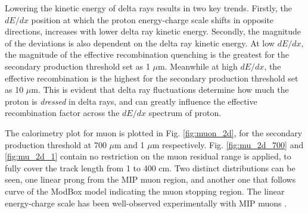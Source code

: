 Lowering the kinetic energy of delta rays results in two key trends.
Firstly, the $dE/dx$ position at which the proton energy-charge scale shifts in opposite directions, increases with lower delta ray kinetic energy. 
Secondly, the magnitude of the deviations is also dependent on the delta ray kinetic energy. 
At low $dE/dx$, the magnitude of the effective recombination quenching is the greatest for the secondary production threshold set as 1 $\mu$m. 
Meanwhile at high $dE/dx$, the effective recombination is the highest for the secondary production threshold set as 10 $\mu$m. 
This is evident that delta ray fluctuations determine how much the proton is \textit{dressed} in delta rays, and can greatly influence the effective recombination factor across the $dE/dx$ spectrum of proton. 

The calorimetry plot for muon is plotted in Fig. \ref{fig:muon_2d}, for the secondary production threshold at 700 $\mu$m and 1 $\mu$m respectively.
Fig. \ref{fig:mu_2d_700} and \ref{fig:mu_2d_1} contain no restriction on the muon residual range is applied, to fully cover the track length from 1 to 400 cm.
Two distinct distributions can be seen, one linear prong from the MIP muon region, and another one that follows curve of the ModBox model indicating the muon stopping region. 
The linear energy-charge scale has been well-observed experimentally with MIP muons \cite{}.
